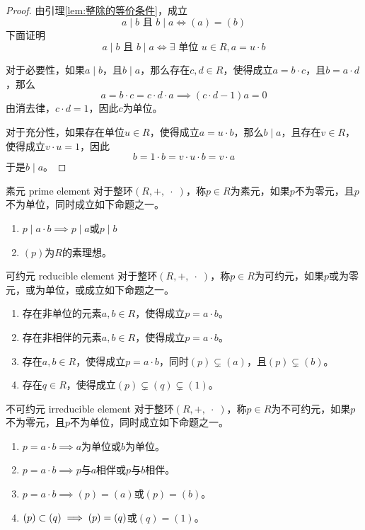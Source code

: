 \begin{proof}
	由引理\ref{lem:整除的等价条件}，成立
	$$
	a\mid b\text{ 且 }b\mid a
	\iff (a)=(b)
	$$
	下面证明
	$$
	a\mid b\text{ 且 }b\mid a
	\iff 
	\exists\text{ 单位 }u\in R,a=u\cdot b
	$$
	
	对于必要性，如果$a\mid b$，且$b\mid a$，那么存在$c,d\in R$，使得成立$a=b\cdot c$，且$b=a \cdot d$，那么
	$$
	a=b\cdot c=c\cdot d\cdot a\implies (c \cdot d-1)a=0
	$$
	由消去律，$c\cdot d=1$，因此$c$为单位。
	
	对于充分性，如果存在单位$u\in R$，使得成立$a=u\cdot b$，那么$b\mid a$，且存在$v\in R$，使得成立$v\cdot u=1$，因此
	$$
	b=1\cdot b=v\cdot u \cdot b=v \cdot a
	$$
	于是$b\mid a$。
\end{proof}

\begin{definition}{素元 prime element}
	对于整环$(R,+,\;\cdot\;)$，称$p\in R$为素元，如果$p$不为零元，且$p$不为单位，同时成立如下命题之一。
	\begin{enumerate}
		\item $p\mid a\cdot b\implies p\mid a$或$p\mid b$
		\item $(p)$为$R$的素理想。
	\end{enumerate}
\end{definition}

\begin{definition}{可约元 reducible element}
	对于整环$(R,+,\;\cdot\;)$，称$p\in R$为可约元，如果$p$或为零元，或为单位，或成立如下命题之一。
	\begin{enumerate}
		\item 存在非单位的元素$a,b\in R$，使得成立$p = a \cdot b$。
		\item 存在非相伴的元素$a,b\in R$，使得成立$p = a \cdot b$。
		\item 存在$a,b\in R$，使得成立$p = a \cdot b$，同时$(p)\subsetneq (a)$，且$(p)\subsetneq (b)$。
		\item 存在$q\in R$，使得成立$(p)\subsetneq (q) \subsetneq (1)$。
	\end{enumerate}
\end{definition}

\begin{definition}{不可约元 irreducible element}
	对于整环$(R,+,\;\cdot\;)$，称$p\in R$为不可约元，如果$p$不为零元，且$p$不为单位，同时成立如下命题之一。
	\begin{enumerate}
		\item $p = a \cdot b \implies a$为单位或$b$为单位。
		\item $p = a\cdot b\implies p$与$a$相伴或$p$与$b$相伴。
		\item $p = a\cdot b\implies (p)=(a)$或$(p)=(b)$。
		\item $(p)\subset (q)\implies (p)=(q)$或$(q)=(1)$。
	\end{enumerate}
\end{definition}

